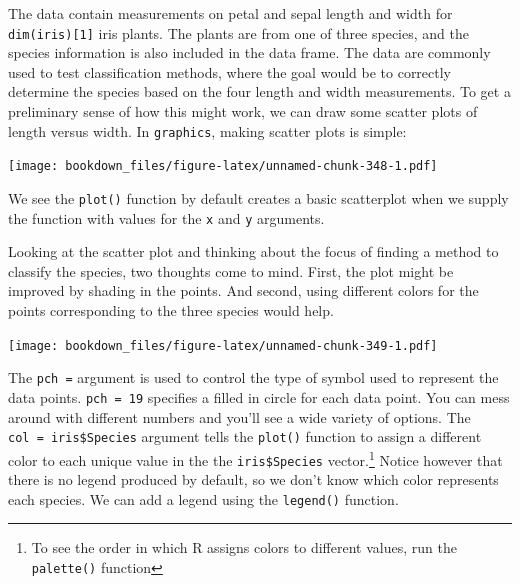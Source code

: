 \documentclass[
]{krantz}
\makeatletter
\newenvironment{Shaded}{\begin{snugshade}}{\end{snugshade}}
\newcommand{\DataTypeTok}[1]{\textcolor[rgb]{0.27,0.27,0.27}{#1}}
\newcommand{\DecValTok}[1]{\textcolor[rgb]{0.06,0.06,0.06}{#1}}
\newcommand{\KeywordTok}[1]{\textcolor[rgb]{0.27,0.27,0.27}{\textbf{#1}}}
\newcommand{\NormalTok}[1]{#1}
\newcommand{\OperatorTok}[1]{\textcolor[rgb]{0.43,0.43,0.43}{\textbf{#1}}}
\newcommand{\StringTok}[1]{\textcolor[rgb]{0.5,0.5,0.5}{#1}}
\newenvironment{kframe}{%
\medskip{}
\setlength{\fboxsep}{.8em}
 \def\at@end@of@kframe{}%
 \ifinner\ifhmode%
  \def\at@end@of@kframe{\end{minipage}}%
  \begin{minipage}{\columnwidth}%
 \fi\fi%
 \def\FrameCommand##1{\hskip\@totalleftmargin \hskip-\fboxsep
 \colorbox{shadecolor}{##1}\hskip-\fboxsep
     \hskip-\linewidth \hskip-\@totalleftmargin \hskip\columnwidth}%
 \MakeFramed {\advance\hsize-\width
   \@totalleftmargin\z@ \linewidth\hsize
   \@setminipage}}%
 {\par\unskip\endMakeFramed%
 \at@end@of@kframe}
\renewenvironment{Shaded}{\begin{kframe}}{\end{kframe}}
\makeatother
\begin{document}
The data contain measurements on petal and sepal length and width for \texttt{dim(iris){[}1{]}} iris plants. The plants are from one of three species, and the species information is also included in the data frame. The data are commonly used to test classification methods, where the goal would be to correctly determine the species based on the four length and width measurements. To get a preliminary sense of how this might work, we can draw some scatter plots of length versus width. In \texttt{graphics}, making scatter plots is simple:

\begin{Shaded}
\end{Shaded}

\texttt{[image: bookdown\_files/figure-latex/unnamed-chunk-348-1.pdf]}

We see the \texttt{plot()} function by default creates a basic scatterplot when we supply the function with values for the \texttt{x} and \texttt{y} arguments.

Looking at the scatter plot and thinking about the focus of finding a method to classify the species, two thoughts come to mind. First, the plot might be improved by shading in the points. And second, using different colors for the points corresponding to the three species would help.

\begin{Shaded}
\end{Shaded}

\texttt{[image: bookdown\_files/figure-latex/unnamed-chunk-349-1.pdf]}

The \texttt{pch\ =} argument is used to control the type of symbol used to represent the data points. \texttt{pch\ =\ 19} specifies a filled in circle for each data point. You can mess around with different numbers and you'll see a wide variety of options. The \texttt{col\ =\ iris\$Species} argument tells the \texttt{plot()} function to assign a different color to each unique value in the the \texttt{iris\$Species} vector.\footnote{To see the order in which R assigns colors to different values, run the \texttt{palette()} function} Notice however that there is no legend produced by default, so we don't know which color represents each species. We can add a legend using the \texttt{legend()} function.
\end{document}
